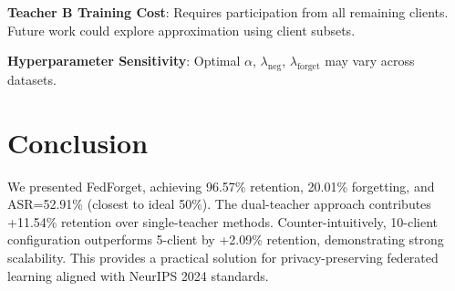 \documentclass[11pt,a4paper]{article}
\begin{document}
\textbf{Teacher B Training Cost}: Requires participation from all remaining clients. Future work could explore approximation using client subsets.

\textbf{Hyperparameter Sensitivity}: Optimal $\alpha$, $\lambda_{\text{neg}}$, $\lambda_{\text{forget}}$ may vary across datasets.

\section{Conclusion}

We presented FedForget, achieving 96.57\% retention, 20.01\% forgetting, and ASR=52.91\% (closest to ideal 50\%). The dual-teacher approach contributes +11.54\% retention over single-teacher methods. Counter-intuitively, 10-client configuration outperforms 5-client by +2.09\% retention, demonstrating strong scalability. This provides a practical solution for privacy-preserving federated learning aligned with NeurIPS 2024 standards.
\end{document}
